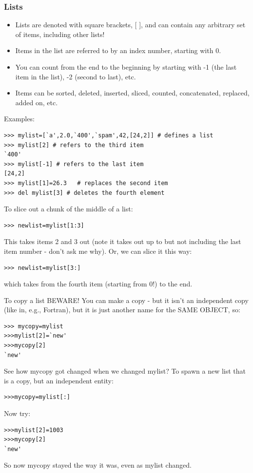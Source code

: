 \documentclass[11pt]{book}
\begin{document}
{\subsubsection{Lists}
\begin{itemize}
\item Lists are denoted with square brackets,  [ ],  and can contain any arbitrary set of items, including other lists!
\item Items in the list are referred to by an index number, starting with 0.
\item You can  count from the end to the beginning by starting with -1 (the last item in the list), -2 (second to last), etc.
\item Items can be sorted, deleted, inserted, sliced, counted, concatenated, replaced, added on, etc.
\end{itemize}
\noindent
Examples:

{ \color{blue} \begin{verbatim}
>>> mylist=[`a',2.0,`400',`spam',42,[24,2]] # defines a list
>>> mylist[2] # refers to the third item
`400'
>>> mylist[-1] # refers to the last item
[24,2]
>>> mylist[1]=26.3   # replaces the second item
>>> del mylist[3] # deletes the fourth element
\end{verbatim}}


\noindent
To slice out a chunk of the middle of a list:
{ \color{blue} \begin{verbatim}
>>> newlist=mylist[1:3]
\end{verbatim}}
\noindent
This takes items 2 and 3 out (note it takes out up to but not including the last item number - don't ask me why).
Or, we can slice it this way:
{ \color{blue} \begin{verbatim}
>>> newlist=mylist[3:]
\end{verbatim}}
\noindent
which takes from the fourth item (starting from 0!) to the end.


To copy a list BEWARE! You can make  a copy - but it isn't an independent copy (like in, e.g.,  Fortran), but it is just another name for the SAME OBJECT, so:
{ \color{blue} \begin{verbatim}
>>> mycopy=mylist
>>>mylist[2]=`new'
>>>mycopy[2]
`new'
\end{verbatim}}
\noindent
See how mycopy got changed when we changed mylist?
\noindent
To spawn a new list that is a copy, but an independent entity:
{ \color{blue} \begin{verbatim}
>>>mycopy=mylist[:]
\end{verbatim}}
\noindent
Now try:
{ \color{blue} \begin{verbatim}
>>>mylist[2]=1003
>>>mycopy[2]
`new'
\end{verbatim}}
\noindent
So now {\color{blue}mycopy}  stayed the way it was, even as {\color{blue}mylist } changed.


}
\end{document}
